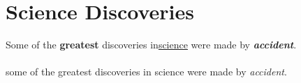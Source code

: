 \documentclass{article}
\begin{document}
	\section{Science Discoveries}
	Some of the \textbf{greatest} discoveries in\underline{science} were made by \textbf{\textit{accident}}.		
		\paragraph{}
		some of the greatest discoveries in science were made by \emph{accident}.
\end{document}
